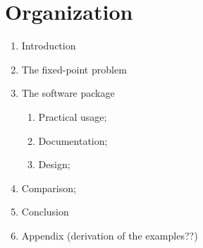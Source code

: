 \section{Organization}
\begin{enumerate}
\item Introduction
\item The fixed-point problem
\item The software package
	\begin{enumerate}
	\item Practical usage;
	\item Documentation;
	\item Design;
	\end{enumerate}
\item Comparison;

\item Conclusion 

\item Appendix (derivation of the examples??)

\end{enumerate}
